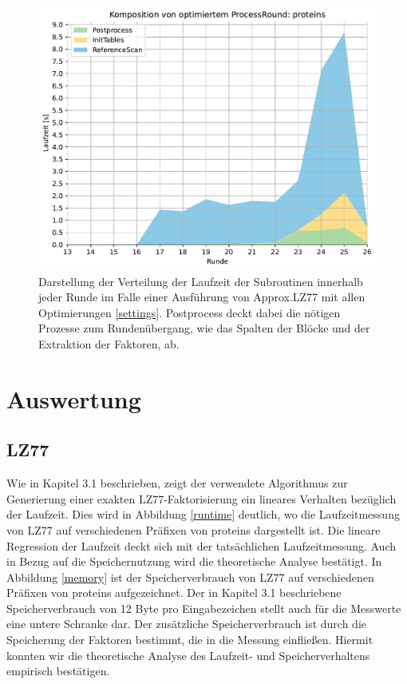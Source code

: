 \begin{figure}[H]
    \centering
    \includegraphics[scale=0.63]{Images/progressive_opt_stack.pdf}
    \caption{Darstellung der Verteilung der Laufzeit der Subroutinen innerhalb jeder Runde im Falle einer Ausführung von Approx.LZ77 mit allen Optimierungen \ref{settings}.
    Postprocess deckt dabei die nötigen Prozesse zum Rundenübergang, wie das Spalten der Blöcke und der Extraktion der Faktoren, ab.}
    \label{opt}
\end{figure}

\section{Auswertung}
\subsection{LZ77}
Wie in Kapitel 3.1 beschrieben, zeigt der verwendete Algorithmus zur Generierung einer exakten LZ77-Faktorisierung ein lineares Verhalten bezüglich der Laufzeit.
Dies wird in Abbildung \ref{runtime} deutlich, wo die Laufzeitmessung von LZ77 auf verschiedenen Präfixen von proteins dargestellt ist. Die lineare Regression der
Laufzeit deckt sich mit der tatsächlichen Laufzeitmessung. Auch in Bezug auf die Speichernutzung wird die theoretische Analyse bestätigt. In Abbildung \ref{memory}
ist der Speicherverbrauch von LZ77 auf verschiedenen Präfixen von proteins aufgezeichnet. Der in Kapitel 3.1 beschriebene Speicherverbrauch von 12 Byte pro Eingabezeichen
stellt auch für die Messwerte eine untere Schranke dar. Der zusätzliche Speicherverbrauch ist durch die Speicherung der Faktoren bestimmt, die in die Messung einfließen.
Hiermit konnten wir die theoretische Analyse des Laufzeit- und Speicherverhaltens empirisch bestätigen.

